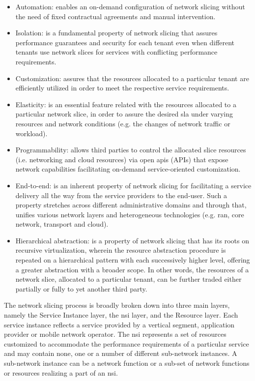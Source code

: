 \begin{itemize}
    \item Automation: enables an on-demand configuration of network slicing without the need of fixed contractual agreements and manual intervention. 
    \item Isolation: is a fundamental property of network slicing that assures performance guarantees and security for each tenant even when different tenants use network slices for services with conflicting performance requirements.
    \item Customization: assures that the resources allocated to a particular tenant are efficiently utilized in order to meet the respective service requirements.
    \item Elasticity: is an essential feature related with the resources allocated to a particular network slice, in order to assure the desired \acrshort{sla} under varying resources and network conditions (e.g. the changes of network traffic or workload).
    \item Programmability: allows third parties to control the allocated slice resources (i.e. networking and cloud resources) via open \acrlong{api}s (APIs) that expose network capabilities facilitating on-demand service-oriented customization.
    \item End-to-end: is an inherent property of network slicing for facilitating a service delivery all the way from the service providers to the end-user. Such a property  stretches across different administrative domains and through that, unifies various network layers and heterogeneous technologies (e.g. \acrshort{ran}, core network, transport and cloud).
    \item Hierarchical abstraction: is a property of network slicing that has its roots on recursive virtualization, wherein the resource abstraction procedure is repeated on a hierarchical pattern with each successively higher level, offering a greater abstraction with a broader scope. In other words, the resources of a network slice, allocated to a particular tenant, can be further traded either partially or fully to yet another third  party. 
\end{itemize}

The network slicing process is broadly broken down into three main layers, namely the Service Instance layer, the \acrfull{nsi} layer, and the Resource layer. Each service instance reflects a service provided by a vertical segment, application provider or mobile network operator. The \acrshort{nsi} represents a set of resources customized to accommodate the performance requirements of a particular service and may contain none, one or a number of different sub-network instances. A sub-network instance can be a network function or a sub-set of network functions or resources realizing a part of an \acrshort{nsi}. 

